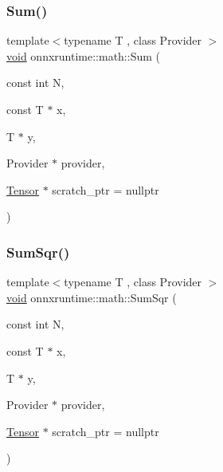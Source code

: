 \mbox{\label{namespaceonnxruntime_1_1math_a45bafaac4b994fa6ad36bcf735f05674}} 
\subsubsection{\texorpdfstring{Sum()}{Sum()}}
{\footnotesize\ttfamily template$<$typename T , class Provider $>$ \\
\mbox{\hyperlink{mlasi_8h_a88f941d423cb2a819b70a1358982b1a6}{void}} onnxruntime\+::math\+::\+Sum (\begin{DoxyParamCaption}\item[{const int}]{N,  }\item[{const T $\ast$}]{x,  }\item[{T $\ast$}]{y,  }\item[{Provider $\ast$}]{provider,  }\item[{\mbox{\hyperlink{classonnxruntime_1_1Tensor}{Tensor}} $\ast$}]{scratch\+\_\+ptr = {\ttfamily nullptr} }\end{DoxyParamCaption})}

\mbox{\label{namespaceonnxruntime_1_1math_a12689bd88fd703f49d1a2d0002bdf515}} 
\subsubsection{\texorpdfstring{Sum\+Sqr()}{SumSqr()}}
{\footnotesize\ttfamily template$<$typename T , class Provider $>$ \\
\mbox{\hyperlink{mlasi_8h_a88f941d423cb2a819b70a1358982b1a6}{void}} onnxruntime\+::math\+::\+Sum\+Sqr (\begin{DoxyParamCaption}\item[{const int}]{N,  }\item[{const T $\ast$}]{x,  }\item[{T $\ast$}]{y,  }\item[{Provider $\ast$}]{provider,  }\item[{\mbox{\hyperlink{classonnxruntime_1_1Tensor}{Tensor}} $\ast$}]{scratch\+\_\+ptr = {\ttfamily nullptr} }\end{DoxyParamCaption})}

\mbox{\label{namespaceonnxruntime_1_1math_a95efa2c6981147ba9a08c2e6db872c94}} 
